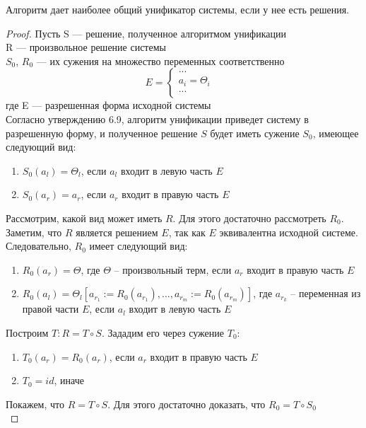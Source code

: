 	\begin{statement} Алгоритм дает наиболее общий унификатор системы, если у нее есть решения. \end{statement}
	\begin{proof}
		Пусть S --- решение, полученное алгоритмом унификации \\
			  R --- произвольное решение системы \\
			  $S_0$, $R_0$ --- их сужения на множество переменных соответственно \\
			  \[E=\begin{cases}
			  ...&\\
			  a_i=\Theta_i&\\
			  ...\\
			  \end{cases}\]
			  где E --- разрешенная форма исходной системы \\
		Согласно утверждению 6.9, алгоритм унификации приведет систему в разрешенную форму, и полученное решение $S$ будет иметь сужение $S_0$, имеющее следующий вид:
		\begin{enumerate}
			\item $S_0(a_l) = \Theta_l$, если $a_l$ входит в левую часть $E$
			\item $S_0(a_r) = a_r$, если $a_r$ входит в правую часть $E$
		\end{enumerate}
		Рассмотрим, какой вид может иметь $R$. Для этого достаточно рассмотреть $R_0$. \\
		Заметим, что $R$ является решением $E$, так как $E$ эквивалентна исходной системе. \\
		Следовательно, $R_0$ имеет следующий вид:
		\begin{enumerate}
			\item $R_0(a_r) = \Theta$, где $\Theta$ -- произвольный терм, если $a_r$ входит в правую часть $E$
			\item $R_0(a_l) = \Theta_l[a_{r_1}:=R_0(a_{r_1}),...,a_{r_m}:=R_0(a_{r_m})]$, где $a_{r_k}$ -- переменная из правой части $E$, если $a_l$ входит в левую часть $E$
		\end{enumerate}
		Построим $T:R=T\circ S$. Зададим его через сужение $T_0$:
		\begin{enumerate}
			\item $T_0(a_r) = R_0(a_r)$, если $a_r$ входит в правую часть $E$
			\item $T_0 = id$, иначе
		\end{enumerate}
		Покажем, что $R=T\circ S$.
		Для этого достаточно доказать, что $R_0 = T \circ S_0$ \\

\end{proof}
